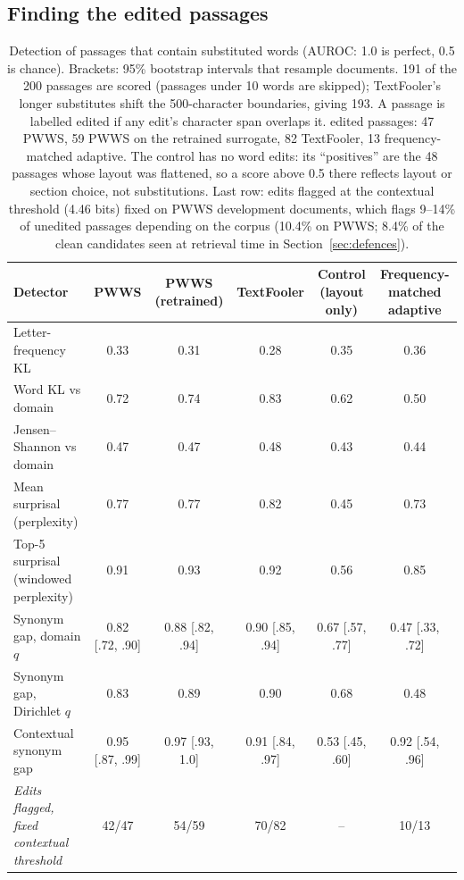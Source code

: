 \documentclass[10pt,journal,compsoc]{IEEEtran}
\begin{document}
\subsection{Finding the edited passages}\label{sec:detection}
\begin{table}[t]
\caption{Detection of passages that contain substituted words (AUROC: 1.0 is perfect, 0.5 is chance). Brackets: 95\% bootstrap intervals that resample documents. 191 of the 200 passages are scored (passages under 10 words are skipped); TextFooler's longer substitutes shift the 500-character boundaries, giving 193. A passage is labelled edited if any edit's character span overlaps it. edited passages: 47 PWWS, 59 PWWS on the retrained surrogate, 82 TextFooler, 13 frequency-matched adaptive. The control has no word edits: its ``positives'' are the 48 passages whose layout was flattened, so a score above 0.5 there reflects layout or section choice, not substitutions. Last row: edits flagged at the contextual threshold (4.46 bits) fixed on PWWS development documents, which flags 9--14\% of unedited passages depending on the corpus (10.4\% on PWWS; 8.4\% of the clean candidates seen at retrieval time in Section~\ref{sec:defences}).}\label{tab:detect}
\centering\footnotesize\setlength{\tabcolsep}{4pt}
\begin{tabular}{@{}lccccc@{}}
\toprule
Detector & PWWS & PWWS (retrained) & TextFooler & Control (layout only) & Frequency-matched adaptive\\
\midrule
Letter-frequency KL & 0.33 & 0.31 & 0.28 & 0.35 & 0.36\\
Word KL vs domain & 0.72 & 0.74 & 0.83 & 0.62 & 0.50\\
Jensen--Shannon vs domain & 0.47 & 0.47 & 0.48 & 0.43 & 0.44\\
Mean surprisal (perplexity) & 0.77 & 0.77 & 0.82 & 0.45 & 0.73\\
Top-5 surprisal (windowed perplexity) & 0.91 & 0.93 & 0.92 & 0.56 & 0.85\\
Synonym gap, domain $q$ & 0.82 [.72, .90] & 0.88 [.82, .94] & 0.90 [.85, .94] & 0.67 [.57, .77] & 0.47 [.33, .72]\\
Synonym gap, Dirichlet $q$ & 0.83 & 0.89 & 0.90 & 0.68 & 0.48\\
Contextual synonym gap & 0.95 [.87, .99] & 0.97 [.93, 1.0] & 0.91 [.84, .97] & 0.53 [.45, .60] & 0.92 [.54, .96]\\
\midrule
\emph{Edits flagged, fixed contextual threshold} & 42/47 & 54/59 & 70/82 & -- & 10/13\\
\bottomrule
\end{tabular}
\end{table}
\end{document}
